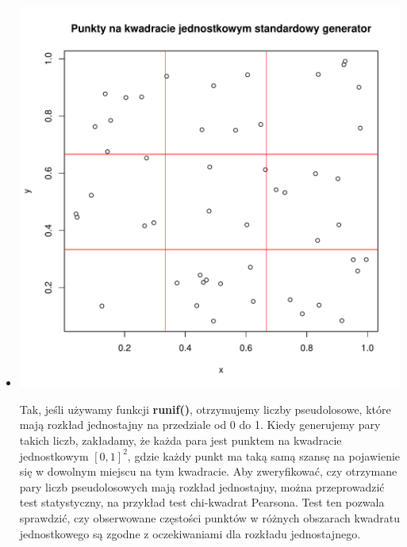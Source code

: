 \documentclass[12pt, a4paper]{article}\usepackage[]{graphicx}\usepackage[]{xcolor}
\makeatletter
\def\maxwidth{ %
  \ifdim\Gin@nat@width>\linewidth
    \linewidth
  \else
    \Gin@nat@width
  \fi
}
\newenvironment{knitrout}{}{} %
\makeatother
\begin{document}
\vspace{15pt}
\begin{itemize}
\item
\begin{minipage}{\linewidth}
\begin{knitrout}
\color{fgcolor}

{\centering \includegraphics[width=\maxwidth]{figure/unnamed-chunk-7-1} 

}


\end{knitrout}
\end{minipage}


Tak, jeśli używamy funkcji \textbf{runif()}, otrzymujemy liczby pseudolosowe, które mają rozkład jednostajny na przedziale od 0 do 1. Kiedy generujemy pary takich liczb, zakładamy, że każda para jest punktem na kwadracie jednostkowym $[0, 1]^{2}$, gdzie każdy punkt ma taką samą szansę na pojawienie się w dowolnym miejscu na tym kwadracie.
Aby zweryfikować, czy otrzymane pary liczb pseudolosowych mają rozkład jednostajny, można przeprowadzić test statystyczny, na przykład test chi-kwadrat Pearsona. Test ten pozwala sprawdzić, czy obserwowane częstości punktów w różnych obszarach kwadratu jednostkowego są zgodne z oczekiwaniami dla rozkładu jednostajnego.


\end{itemize}
\end{document}
